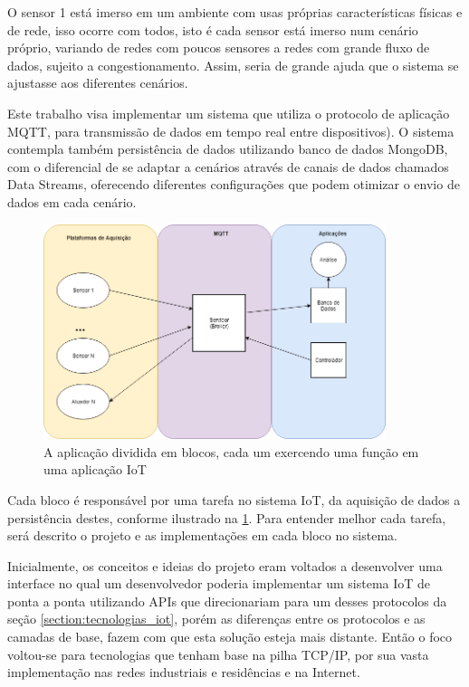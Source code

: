 O sensor 1 está imerso em um ambiente com usas próprias características físicas e de rede, isso ocorre com todos, isto é cada sensor está imerso num cenário próprio, variando de redes com poucos sensores a redes com grande fluxo de dados, sujeito a congestionamento. Assim, seria de grande ajuda que o  sistema se ajustasse aos diferentes cenários.

Este trabalho visa implementar um sistema que utiliza o protocolo de aplicação MQTT, para transmissão de dados em tempo real entre dispositivos). O sistema contempla também persistência de dados utilizando banco de dados MongoDB, com o diferencial de se adaptar a cenários através de canais de dados chamados Data Streams, oferecendo diferentes configurações que podem otimizar o envio de dados em cada cenário.

\begin{figure}[h!]
\centering
\includegraphics[width=10cm]{./02_Capitulos/02_Cap1/figures/iot_app-layers}
\caption{A aplicação dividida em blocos, cada um exercendo uma função em uma aplicação IoT}
\label{fig:1.1.0/iot_app-layers}
\end{figure}


Cada bloco é responsável por uma tarefa no sistema IoT, da aquisição de dados a persistência destes, conforme ilustrado na \ref{fig:1.1.0/iot_app-layers}. Para entender melhor cada tarefa, será descrito o projeto e as implementações em cada bloco no sistema.

Inicialmente, os conceitos e ideias do projeto eram voltados a desenvolver uma interface no qual um desenvolvedor poderia implementar um sistema IoT de ponta a ponta utilizando APIs que direcionariam para um desses protocolos da seção \ref{section:tecnologias_iot}, porém as diferenças entre os protocolos e as camadas de base, fazem com que esta solução esteja mais distante. Então o foco voltou-se  para tecnologias que tenham base na pilha TCP/IP, por sua vasta implementação nas redes industriais e residências e na Internet.
